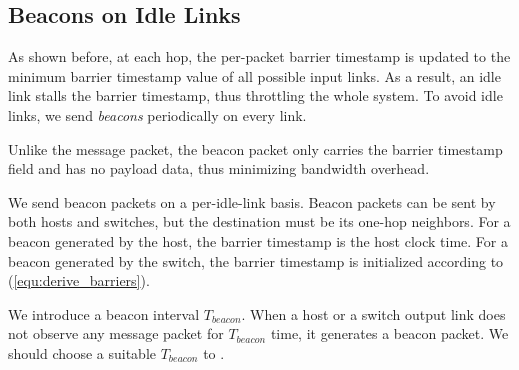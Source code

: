 \subsection{Beacons on Idle Links}
\label{sec:beacon}

As shown before, at each hop, the per-packet barrier timestamp is updated to the minimum barrier timestamp value of all possible input links.
As a result, an idle link stalls the barrier timestamp, thus throttling the whole system.
To avoid idle links, we send \textit{beacons} periodically on every link.



Unlike the message packet, the beacon packet only carries the barrier timestamp field and has no payload data, thus minimizing bandwidth overhead. 

We send beacon packets on a per-idle-link basis.
Beacon packets can be sent by both hosts and switches,
but the destination must be its one-hop neighbors.
For a beacon generated by the host, the barrier timestamp is the host clock time. For a beacon generated by the switch, the barrier timestamp is initialized according to (\ref{equ:derive_barriers}).

We introduce a beacon interval $T_{beacon}$. When a host or a switch output link does not observe any message packet for $T_{beacon}$ time, it generates a beacon packet. We should choose a suitable $T_{beacon}$ to . 

